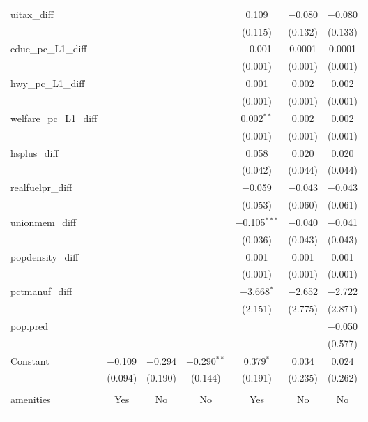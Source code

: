 \begin{table}[!htbp]
\begin{tabular}{@{\extracolsep{5pt}}lcccccc}
  uitax\_diff &  &  &  & 0.109 & $-$0.080 & $-$0.080 \\ 
  &  &  &  & (0.115) & (0.132) & (0.133) \\ 
  educ\_pc\_L1\_diff &  &  &  & $-$0.001 & 0.0001 & 0.0001 \\ 
  &  &  &  & (0.001) & (0.001) & (0.001) \\ 
  hwy\_pc\_L1\_diff &  &  &  & 0.001 & 0.002 & 0.002 \\ 
  &  &  &  & (0.001) & (0.001) & (0.001) \\ 
  welfare\_pc\_L1\_diff &  &  &  & 0.002$^{**}$ & 0.002 & 0.002 \\ 
  &  &  &  & (0.001) & (0.001) & (0.001) \\ 
  hsplus\_diff &  &  &  & 0.058 & 0.020 & 0.020 \\ 
  &  &  &  & (0.042) & (0.044) & (0.044) \\ 
  realfuelpr\_diff &  &  &  & $-$0.059 & $-$0.043 & $-$0.043 \\ 
  &  &  &  & (0.053) & (0.060) & (0.061) \\ 
  unionmem\_diff &  &  &  & $-$0.105$^{***}$ & $-$0.040 & $-$0.041 \\ 
  &  &  &  & (0.036) & (0.043) & (0.043) \\ 
  popdensity\_diff &  &  &  & 0.001 & 0.001 & 0.001 \\ 
  &  &  &  & (0.001) & (0.001) & (0.001) \\ 
  pctmanuf\_diff &  &  &  & $-$3.668$^{*}$ & $-$2.652 & $-$2.722 \\ 
  &  &  &  & (2.151) & (2.775) & (2.871) \\ 
  pop.pred &  &  &  &  &  & $-$0.050 \\ 
  &  &  &  &  &  & (0.577) \\ 
  Constant & $-$0.109 & $-$0.294 & $-$0.290$^{**}$ & 0.379$^{*}$ & 0.034 & 0.024 \\ 
  & (0.094) & (0.190) & (0.144) & (0.191) & (0.235) & (0.262) \\ 
 \hline \\[-1.8ex] 
amenities & Yes & No & No & Yes & No & No \\ 
\hline \\[-1.8ex] 
\hline 
\hline \\[-1.8ex] 
\end{tabular} 
\end{table} 
